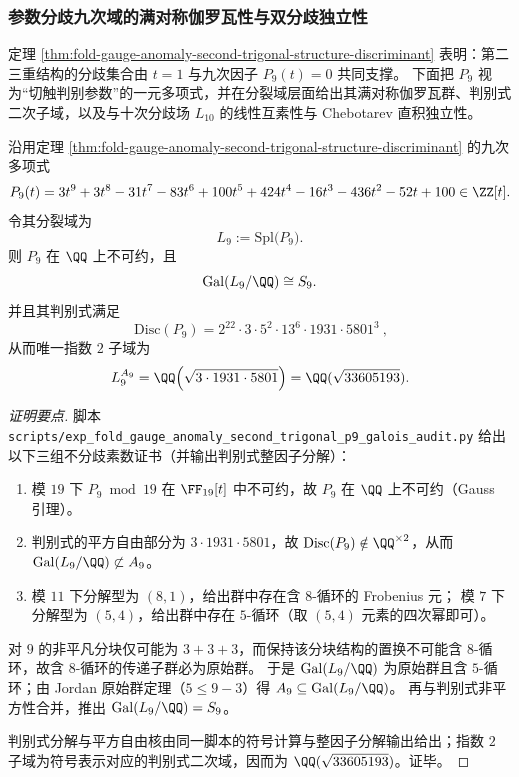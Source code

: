 \subsubsection{参数分歧九次域的满对称伽罗瓦性与双分歧独立性}\label{subsubsec:fold-gauge-anomaly-second-trigonal-p9-branchfield-arithmetic}
定理 \ref{thm:fold-gauge-anomaly-second-trigonal-structure-discriminant} 表明：第二三重结构的分歧集合由 \(t=1\) 与九次因子 \(P_9(t)=0\) 共同支撑。
下面把 \(P_9\) 视为“切触判别参数”的一元多项式，并在分裂域层面给出其满对称伽罗瓦群、判别式二次子域，以及与十次分歧场 \(L_{10}\) 的线性互素性与 Chebotarev 直积独立性。

\begin{theorem}[参数九次因子的满对称伽罗瓦群]\label{thm:fold-gauge-anomaly-P9-galois-discriminant}
沿用定理 \ref{thm:fold-gauge-anomaly-second-trigonal-structure-discriminant} 的九次多项式
\[
P_9(t)=3t^9+3t^8-31t^7-83t^6+100t^5+424t^4-16t^3-436t^2-52t+100\in\ZZ[t].
\]
令其分裂域为
\[
L_9:=\mathrm{Spl}\bigl(P_9\bigr).
\]
则 \(P_9\) 在 \(\QQ\) 上不可约，且
\[
\mathrm{Gal}(L_9/\QQ)\cong S_9.
\]
并且其判别式满足
\[
\boxed{\ \mathrm{Disc}(P_9)=2^{22}\cdot 3\cdot 5^{2}\cdot 13^{6}\cdot 1931\cdot 5801^{3}\ },
\]
从而唯一指数 \(2\) 子域为
\[
L_9^{A_9}=\QQ\!\left(\sqrt{3\cdot 1931\cdot 5801}\right)=\QQ(\sqrt{33605193}).
\]
\end{theorem}
\begin{proof}[证明要点]
脚本 \texttt{scripts/exp\_fold\_gauge\_anomaly\_second\_trigonal\_p9\_galois\_audit.py} 给出以下三组不分歧素数证书（并输出判别式整因子分解）：
\begin{enumerate}
  \item 模 \(19\) 下 \(P_9\bmod 19\) 在 \(\FF_{19}[t]\) 中不可约，故 \(P_9\) 在 \(\QQ\) 上不可约（Gauss 引理）。
  \item 判别式的平方自由部分为 \(3\cdot 1931\cdot 5801\)，故 \(\mathrm{Disc}(P_9)\notin\QQ^{\times 2}\)，从而 \(\mathrm{Gal}(L_9/\QQ)\not\subset A_9\)。
  \item 模 \(11\) 下分解型为 \((8,1)\)，给出群中存在含 \(8\)-循环的 Frobenius 元；
        模 \(7\) 下分解型为 \((5,4)\)，给出群中存在 \(5\)-循环（取 \((5,4)\) 元素的四次幂即可）。
\end{enumerate}
对 \(9\) 的非平凡分块仅可能为 \(3+3+3\)，而保持该分块结构的置换不可能含 \(8\)-循环，故含 \(8\)-循环的传递子群必为原始群。
于是 \(\mathrm{Gal}(L_9/\QQ)\) 为原始群且含 \(5\)-循环；由 Jordan 原始群定理（\(5\le 9-3\)）得 \(A_9\subseteq \mathrm{Gal}(L_9/\QQ)\)。
再与判别式非平方性合并，推出 \(\mathrm{Gal}(L_9/\QQ)=S_9\)。
\par
判别式分解与平方自由核由同一脚本的符号计算与整因子分解输出给出；指数 \(2\) 子域为符号表示对应的判别式二次域，因而为 \(\QQ(\sqrt{33605193})\)。证毕。
\end{proof}


